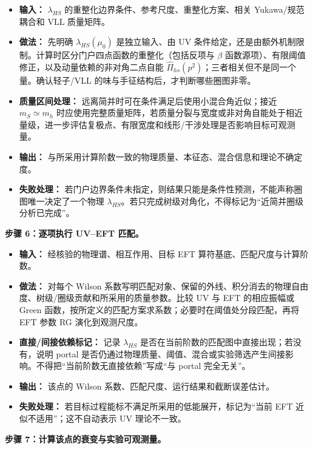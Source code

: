 \documentclass[
]{article}
\providecommand{\tightlist}{%
  \setlength{\itemsep}{0pt}\setlength{\parskip}{0pt}}
\begin{document}
\begin{itemize}
\tightlist
\item
  \textbf{输入：} \(\lambda_{HS}\)
  的重整化边界条件、参考尺度、重整化方案、相关 Yukawa/规范耦合和 VLL
  质量矩阵。
\item
  \textbf{做法：} 先明确 \(\lambda_{HS}(\mu_0)\) 是独立输入、由 UV
  条件给定，还是由额外机制限制。计算时区分门户四点函数的重整化（包括反项与
  \(\beta\) 函数源项）、有限阈值修正，以及动量依赖的非对角二点自能
  \(\widehat\Pi_{hs}(p^2)\)；三者相关但不是同一个量。确认轻子/VLL
  的味与手征结构后，才判断哪些圈图非零。
\item
  \textbf{质量区间处理：} 远离简并时可在条件满足后使用小混合角近似；接近
  \(m_S\simeq m_h\)
  时应使用完整质量矩阵，若质量分裂与宽度或非对角自能处于相近量级，进一步评估复极点、有限宽度和线形/干涉处理是否影响目标可观测量。
\item
  \textbf{输出：}
  与所采用计算阶数一致的物理质量、本征态、混合信息和理论不确定度。
\item
  \textbf{失败处理：}
  若门户边界条件未指定，则结果只能是条件性预测，不能声称圈图唯一决定了一个物理
  \(\lambda_{HS}\)。若只完成树级对角化，不得标记为``近简并圈级分析已完成''。
\end{itemize}

\textbf{步骤 6：逐项执行 UV--EFT 匹配。}

\begin{itemize}
\tightlist
\item
  \textbf{输入：} 经核验的物理谱、相互作用、目标 EFT
  算符基底、匹配尺度与计算阶数。
\item
  \textbf{做法：} 对每个 Wilson
  系数写明匹配对象、保留的外线、积分消去的物理自由度、树级/圈级贡献和所采用的质量参数。比较
  UV 与 EFT 的相应振幅或 Green
  函数，按所定义的匹配方案求系数；必要时在阈值处分段匹配，再将 EFT 参数
  RG 演化到观测尺度。
\item
  \textbf{直接/间接依赖标记：} 记录 \(\lambda_{HS}\)
  是否在当前阶数的匹配图中直接出现；若没有，说明 portal
  是否仍通过物理质量、阈值、混合或实验筛选产生间接影响。不得把``当前阶数无直接依赖''写成``与
  portal 完全无关''。
\item
  \textbf{输出：} 该点的 Wilson 系数、匹配尺度、运行结果和截断误差估计。
\item
  \textbf{失败处理：} 若目标过程能标不满足所采用的低能展开，标记为``当前
  EFT 近似不适用''；这不自动表示 UV 理论不一致。
\end{itemize}

\textbf{步骤 7：计算该点的衰变与实验可观测量。}
\end{document}
